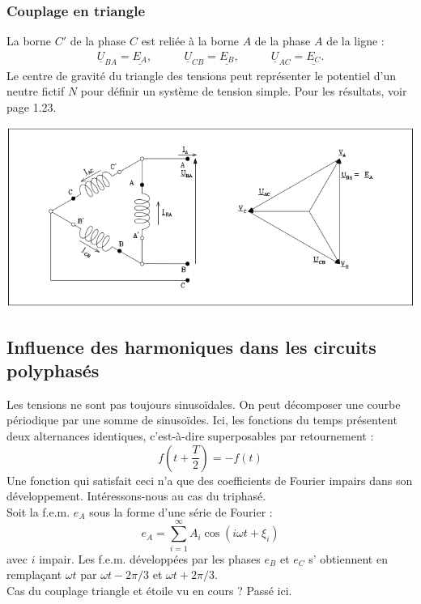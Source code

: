 \subsubsection{Couplage en triangle}
La borne $C'$ de la phase $C$ est reliée à la borne $A$ de la phase 
$A$ de la ligne :
\begin{equation}
	\begin{array}{ccc}
		\underline{U}_{BA} = \underline{E_A},\quad & \quad \underline{U}_{CB} =                  
		\underline{E_B}, \quad                     & \quad \underline{U}_{AC} = \underline{E_C}. 
	\end{array}		
\end{equation}
Le centre de gravité du triangle des tensions peut représenter le 
potentiel d'un neutre fictif $N$ pour définir un système de tension 
simple. Pour les résultats, voir page 1.23.
\begin{center}
	\includegraphics[scale=0.4]{ch1/image10.png}
\end{center}		
		
		
\subsection{Influence des harmoniques dans les circuits polyphasés}
Les tensions ne sont pas toujours sinusoïdales. On peut décomposer une courbe 
périodique par une somme de sinusoïdes. Ici, les fonctions du temps 
présentent deux alternances identiques, c'est-à-dire superposables par 
retournement :
\begin{equation}
	f(t+\frac{T}{2}) = -f(t)
\end{equation}
Une fonction qui satisfait ceci n'a que des coefficients de Fourier impairs 
dans son développement. Intéressons-nous au cas du triphasé. \\
Soit la f.e.m. $e_A$ sous la forme d'une série de Fourier :
\begin{equation}
	e_A = \sum_{i=1}^\infty A_i\cos(i\omega t + \xi_i)
\end{equation}
avec $i$ impair. Les f.e.m. développées par les phases $e_B$ et $e_C$ s'
obtiennent en remplaçant $\omega t$ par $\omega t - 2\pi/3$ et $\omega t 
+2\pi/3$.\\
Cas du couplage triangle et étoile vu en cours ? Passé ici.
	

